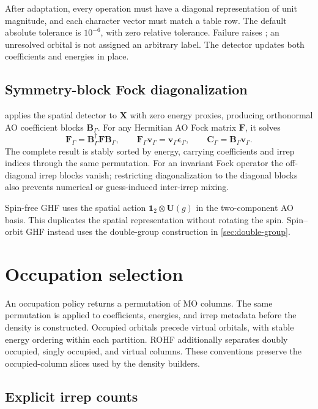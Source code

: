 \documentclass[aip,jcp,preprint,nobibnotes,nofootinbib]{revtex4-1}
\newcommand{\bvec}[1]{\mathbf{#1}}
\newcommand{\Id}{\bvec{1}}
\newcommand{\code}[1]{\texttt{\detokenize{#1}}}
\begin{document}
After adaptation, every operation must have a diagonal representation of unit
magnitude, and each character vector must match a table row. The default
absolute tolerance is $10^{-6}$, with zero relative tolerance. Failure raises
\code{RuntimeError}; an unresolved orbital is not assigned an arbitrary label.
The detector updates both coefficients and energies in place.

\subsection{Symmetry-block Fock diagonalization}

\code{SymmetryBasis.build} applies the spatial detector to $\bvec{X}$ with
zero energy proxies, producing orthonormal AO coefficient blocks
$\bvec{B}_\Gamma$. For any Hermitian AO Fock matrix $\bvec{F}$, it solves
\begin{equation}
 \bvec{F}_\Gamma=\bvec{B}_\Gamma^\dagger\bvec{F}\bvec{B}_\Gamma,
 \qquad
 \bvec{F}_\Gamma\bvec{v}_\Gamma
   =\bvec{v}_\Gamma\bvec{\epsilon}_\Gamma,
 \qquad
 \bvec{C}_\Gamma=\bvec{B}_\Gamma\bvec{v}_\Gamma.
 \label{eq:block-fock}
\end{equation}
The complete result is stably sorted by energy, carrying coefficients and
irrep indices through the same permutation. For an invariant Fock operator
the off-diagonal irrep blocks vanish; restricting diagonalization to the
diagonal blocks also prevents numerical or guess-induced inter-irrep mixing.

Spin-free GHF uses the spatial action $\Id_2\otimes\bvec{U}(g)$ in the
two-component AO basis. This duplicates the spatial representation without
rotating the spin. Spin--orbit GHF instead uses the double-group construction
in \cref{sec:double-group}.

\section{Occupation selection}
\label{sec:selection}

An occupation policy returns a permutation of MO columns. The same
permutation is applied to coefficients, energies, and irrep metadata before
the density is constructed. Occupied orbitals precede virtual orbitals, with
stable energy ordering within each partition. ROHF additionally separates
doubly occupied, singly occupied, and virtual columns. These conventions
preserve the occupied-column slices used by the density builders.

\subsection{Explicit irrep counts}
\end{document}
